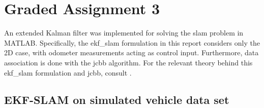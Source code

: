 \section{Graded Assignment 3}\label{sec:graded_assignment_3}


An extended Kalman filter was implemented for solving the \acrshort{slam} problem in MATLAB. Specifically, the \acrshort{ekf_slam} formulation in this report considers only the 2D case, with odometer measurements acting as control input. Furthermore, data association is done with the \acrshort{jcbb} algorithm. For the relevant theory behind this \acrshort{ekf_slam} formulation and \acrshort{jcbb}, consult \cite[p. 185 - 196]{Edmund}.

\subsection{EKF-SLAM on simulated vehicle data set}



